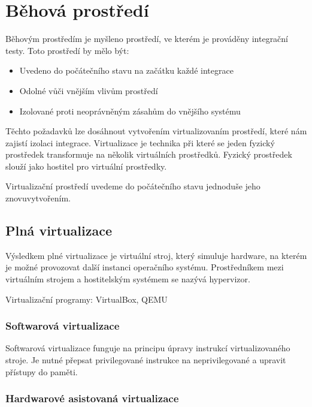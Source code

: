 \chapter{Běhová prostředí}

Běhovým prostředím je myšleno prostředí, ve kterém je prováděny integrační testy.
Toto prostředí by mělo být:

\begin{itemize}
	\item Uvedeno do počátečního stavu na začátku každé integrace
	\item Odolné vůči vnějším vlivům prostředí
	\item Izolované proti neoprávněným zásahům do vnějšího systému
\end{itemize}

Těchto požadavků lze dosáhnout vytvořením virtualizovaním prostředí, které nám zajistí izolaci integrace.
Virtualizace je technika při které se jeden fyzický prostředek transformuje na několik virtuálních prostředků.
Fyzický prostředek slouží jako hostitel pro virtuální prostředky.

Virtualizační prostředí uvedeme do počátečního stavu jednoduše jeho znovuvytvořením.


\section{Plná virtualizace}


Výsledkem plné virtualizace je virtuální stroj, který simuluje hardware, na kterém je možné provozovat další instanci operačního systému.
Prostředníkem mezi virtuálním strojem a hostitelským systémem se nazývá hypervizor.


Virtualizační programy: VirtualBox, QEMU

\subsection{Softwarová virtualizace}

Softwarová virtualizace funguje na principu úpravy instrukcí virtualizovaného stroje.
Je nutné přepsat privilegované instrukce na neprivilegované a upravit přístupy do paměti.

\subsection{Hardwarové asistovaná virtualizace}

